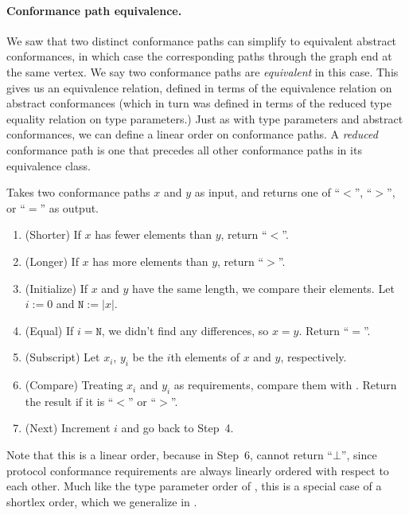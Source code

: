 \documentclass[../generics]{subfiles}
\begin{document}
\paragraph{Conformance path equivalence.}
We saw that two distinct conformance paths can simplify to equivalent abstract conformances, in which case the corresponding paths through the graph end at the same vertex. We say two conformance paths are \emph{equivalent} in this case. This gives us an equivalence relation, defined in terms of the equivalence relation on abstract conformances (which in turn was defined in terms of the reduced type equality relation on type parameters.) Just as with type parameters and abstract conformances, we can define a linear order on conformance paths. A \emph{reduced} conformance path is one that precedes all other conformance paths in its equivalence class.
\begin{algorithm}\label{conformance path order alg}
Takes two conformance paths $x$ and $y$ as input, and returns one of ``$<$'', ``$>$'', or ``$=$'' as output.
\begin{enumerate}
\item (Shorter) If $x$ has fewer elements than $y$, return ``$<$''.
\item (Longer) If $x$ has more elements than $y$, return ``$>$''.
\item (Initialize) If $x$ and $y$ have the same length, we compare their elements. Let $i:=0$ and $\texttt{N}:=|x|$.
\item (Equal) If $i=\texttt{N}$, we didn't find any differences, so $x=y$. Return ``$=$''.
\item (Subscript) Let $x_i$, $y_i$ be the $i$th elements of $x$ and $y$, respectively.
\item (Compare) Treating $x_i$ and $y_i$ as requirements, compare them with . Return the result if it is ``$<$'' or ``$>$''.
\item (Next) Increment $i$ and go back to Step~4.
\end{enumerate}
\end{algorithm}
Note that this is a linear order, because in Step~6,  cannot return ``$\bot$'', since protocol conformance requirements are always linearly ordered with respect to each other. Much like the type parameter order of , this is a special case of a shortlex order, which we generalize in .
\end{document}
